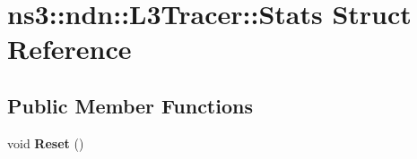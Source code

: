 \hypertarget{structns3_1_1ndn_1_1L3Tracer_1_1Stats}{}\section{ns3\+:\+:ndn\+:\+:L3\+Tracer\+:\+:Stats Struct Reference}
\label{structns3_1_1ndn_1_1L3Tracer_1_1Stats}
\subsection*{Public Member Functions}
\begin{DoxyCompactItemize}
\item 
void {\bfseries Reset} ()\hypertarget{structns3_1_1ndn_1_1L3Tracer_1_1Stats_aec6ab86ca842efe840dcf2887ac26e50}{}\label{structns3_1_1ndn_1_1L3Tracer_1_1Stats_aec6ab86ca842efe840dcf2887ac26e50}

\end{DoxyCompactItemize}
